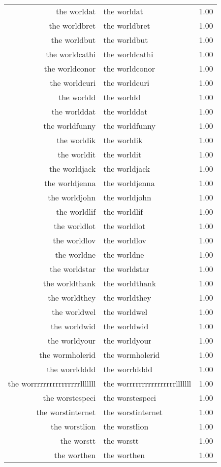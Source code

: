 \begin{table}[ht]
\begin{tabular}{rlr}
  the worldat & the worldat & 1.00 \\ 
  the worldbret & the worldbret & 1.00 \\ 
  the worldbut & the worldbut & 1.00 \\ 
  the worldcathi & the worldcathi & 1.00 \\ 
  the worldconor & the worldconor & 1.00 \\ 
  the worldcuri & the worldcuri & 1.00 \\ 
  the worldd & the worldd & 1.00 \\ 
  the worlddat & the worlddat & 1.00 \\ 
  the worldfunny & the worldfunny & 1.00 \\ 
  the worldik & the worldik & 1.00 \\ 
  the worldit & the worldit & 1.00 \\ 
  the worldjack & the worldjack & 1.00 \\ 
  the worldjenna & the worldjenna & 1.00 \\ 
  the worldjohn & the worldjohn & 1.00 \\ 
  the worldlif & the worldlif & 1.00 \\ 
  the worldlot & the worldlot & 1.00 \\ 
  the worldlov & the worldlov & 1.00 \\ 
  the worldne & the worldne & 1.00 \\ 
  the worldstar & the worldstar & 1.00 \\ 
  the worldthank & the worldthank & 1.00 \\ 
  the worldthey & the worldthey & 1.00 \\ 
  the worldwel & the worldwel & 1.00 \\ 
  the worldwid & the worldwid & 1.00 \\ 
  the worldyour & the worldyour & 1.00 \\ 
  the wormholerid & the wormholerid & 1.00 \\ 
  the worrldddd & the worrldddd & 1.00 \\ 
  the worrrrrrrrrrrrrrrrlllllll & the worrrrrrrrrrrrrrrrlllllll & 1.00 \\ 
  the worstespeci & the worstespeci & 1.00 \\ 
  the worstinternet & the worstinternet & 1.00 \\ 
  the worstlion & the worstlion & 1.00 \\ 
  the worstt & the worstt & 1.00 \\ 
  the worthen & the worthen & 1.00 \\ 

\end{tabular}
\end{table}
